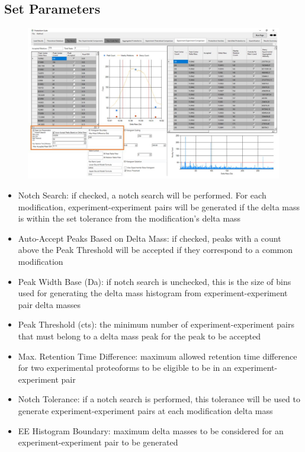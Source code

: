 \subsection{Set Parameters}
\begin{figure}[h]
\centering
\includegraphics[scale=0.43]{figures/ee1.jpg}
\end{figure}
\begin{itemize}
\item Notch Search: if checked, a notch search will be performed. For each modification, experiment-experiment pairs will be generated if the delta mass is within the set tolerance from the modification's delta mass
\item Auto-Accept Peaks Based on Delta Mass: if checked, peaks with a count above the Peak Threshold will be accepted if they correspond to a common modification
\item Peak Width Base (Da): if notch search is unchecked, this is the size of bins used for generating the delta mass histogram from experiment-experiment pair delta masses
\item Peak Threshold (cts): the minimum number of experiment-experiment pairs that must belong to a delta mass peak for the peak to be accepted
\item Max. Retention Time Difference: maximum allowed retention time difference for two experimental proteoforms to be eligible to be in an experiment-experiment pair
\item Notch Tolerance: if a notch search is performed, this tolerance will be used to generate experiment-experiment pairs at each modification delta mass
\item EE Histogram Boundary: maximum delta masses to be considered for an experiment-experiment pair to be generated 
\end{itemize}

